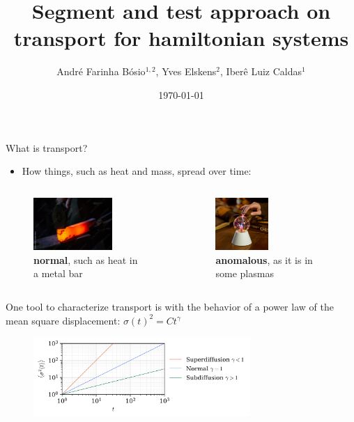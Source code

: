 \documentclass[10pt]{beamer}
\title{Segment and test approach on transport for hamiltonian systems}
\date{\today}
\author{André Farinha Bósio$^{1,2}$, Yves Elskens$^{2}$, Iberê Luiz Caldas$^{1}$}
\institute{$^1$Universidade de São Paulo - Brazil\\ $^2$Aix-Marseille Université - France}
\begin{document}
\maketitle






\begin{frame}{What is transport?}
\begin{itemize}
    \item How things, such as heat and mass, spread over time:
\end{itemize}

\begin{columns}[t]
    \begin{column}{0.5\textwidth}
    \begin{figure}
        \includegraphics[height = 2cm]{imgs/heat.jpg}
        \caption*{\textbf{normal}, such as heat in a metal bar}
    \end{figure}    
    

    \end{column}
    \begin{column}{0.5\textwidth}
        \begin{figure}
            \includegraphics[height = 2cm]{imgs/plasma.jpg}
            \caption*{\textbf{anomalous}, as it is in some plasmas}
        \end{figure}   
    \end{column}
    
\end{columns}
One tool to characterize transport is with the behavior of a power law of the mean square displacement: $\sigma(t)^2 = Ct^\gamma$
\begin{figure}[l]
    \includegraphics[height = 3cm]{other/graph.png}
\end{figure}



\end{frame}
\end{document}
